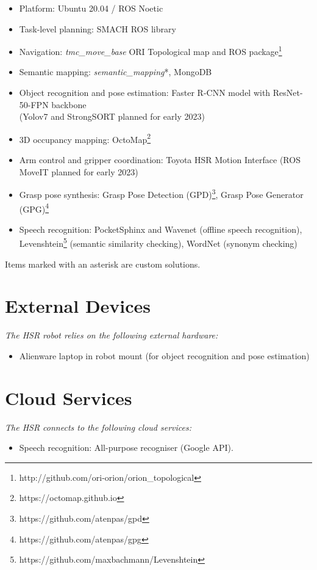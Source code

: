 \begin{itemize}
	\item Platform: Ubuntu 20.04 / ROS Noetic
	\item Task-level planning: SMACH ROS library
	\item Navigation: \textit{tmc\_move\_base} ORI Topological map and ROS package\footnote{http://github.com/ori-orion/orion\_topological}
	\item Semantic mapping: \emph{semantic\_mapping}*, \mbox{MongoDB}
	\item Object recognition and pose estimation: Faster R-CNN model with ResNet-50-FPN backbone \\ (Yolov7 and StrongSORT planned for early 2023)
	\item 3D occupancy mapping: OctoMap\footnote{https://octomap.github.io}
	\item Arm control and gripper coordination: Toyota HSR Motion Interface (ROS MoveIT planned for early 2023)
	\item Grasp pose synthesis: Grasp Pose Detection  (GPD)\footnote{https://github.com/atenpas/gpd}, Grasp Pose Generator (GPG)\footnote{https://github.com/atenpas/gpg}
	\item Speech recognition: PocketSphinx and Wavenet (offline speech recognition), Levenshtein\footnote{https://github.com/maxbachmann/Levenshtein} (semantic similarity checking), WordNet (synonym checking) 
\end{itemize}

\noindent Items marked with an asterisk are \teamori{} custom solutions.

\section*{External Devices}

\textit{The HSR robot relies on the following external hardware:}

\begin{itemize}
	\item Alienware laptop in robot mount (for object recognition and pose estimation)
\end{itemize}


\section*{Cloud Services}

\textit{The HSR connects to the following cloud services:}
\begin{itemize}
	\item Speech recognition: All-purpose recogniser (Google API).
\end{itemize}